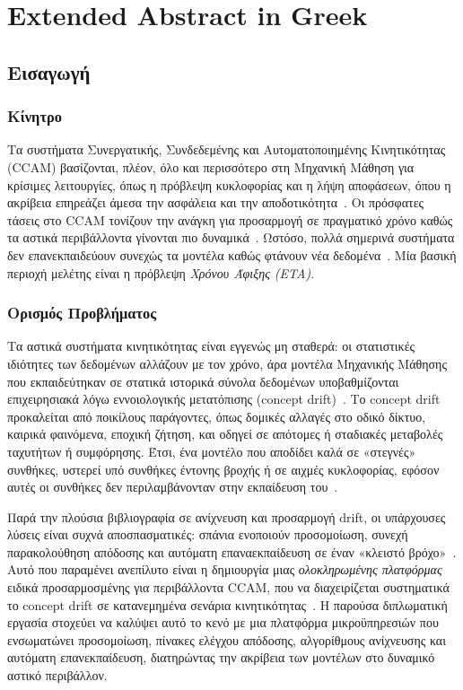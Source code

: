\chapter*{Extended Abstract in Greek}

\section*{Εισαγωγή}

\subsection*{Κίνητρο}
Τα συστήματα Συνεργατικής, Συνδεδεμένης και Αυτοματοποιημένης Κινητικότητας (CCAM) βασίζονται, πλέον, όλο και περισσότερο στη Μηχανική Μάθηση για κρίσιμες λειτουργίες, όπως η πρόβλεψη κυκλοφορίας και η λήψη αποφάσεων, όπου η ακρίβεια επηρεάζει άμεσα την ασφάλεια και την αποδοτικότητα~\cite{ertrac2022ccam}.
Οι πρόσφατες τάσεις στο CCAM τονίζουν την ανάγκη για προσαρμογή σε πραγματικό χρόνο καθώς τα αστικά περιβάλλοντα γίνονται πιο δυναμικά~\cite{abdi2021travel}.
Ωστόσο, πολλά σημερινά συστήματα δεν επανεκπαιδεύουν συνεχώς τα μοντέλα καθώς φτάνουν νέα δεδομένα~\cite{arifi2024eta}.
Μία βασική περιοχή μελέτης είναι η πρόβλεψη \textit{Χρόνου Άφιξης (ETA)}.

\subsection*{Ορισμός Προβλήματος}
Τα αστικά συστήματα κινητικότητας είναι εγγενώς μη σταθερά: οι στατιστικές ιδιότητες των δεδομένων αλλάζουν με τον χρόνο, άρα μοντέλα Μηχανικής Μάθησης που εκπαιδεύτηκαν σε στατικά ιστορικά σύνολα δεδομένων υποβαθμίζονται επιχειρησιακά λόγω εννοιολογικής μετατόπισης (concept drift)~\cite{gama2014survey, lu2018learning}.
Το concept drift προκαλείται από ποικίλους παράγοντες, όπως δομικές αλλαγές στο οδικό δίκτυο, καιρικά φαινόμενα, εποχική ζήτηση, και οδηγεί σε απότομες ή σταδιακές μεταβολές ταχυτήτων ή συμφόρησης.
Έτσι, ένα μοντέλο που αποδίδει καλά σε «στεγνές» συνθήκες, υστερεί υπό συνθήκες έντονης βροχής ή σε αιχμές κυκλοφορίας, εφόσον αυτές οι συνθήκες δεν περιλαμβάνονταν στην εκπαίδευση του~\cite{baier2020error}.

Παρά την πλούσια βιβλιογραφία σε ανίχνευση και προσαρμογή drift, οι υπάρχουσες λύσεις είναι συχνά αποσπασματικές: σπάνια ενοποιούν προσομοίωση, συνεχή παρακολούθηση απόδοσης και αυτόματη επαναεκπαίδευση σε έναν «κλειστό βρόχο»~\cite{lu2018learning, greco2025drift}.
Αυτό που παραμένει ανεπίλυτο είναι η δημιουργία μιας \textit{ολοκληρωμένης πλατφόρμας} ειδικά προσαρμοσμένης για περιβάλλοντα CCAM, που να διαχειρίζεται συστηματικά το concept drift σε κατανεμημένα σενάρια κινητικότητας~\cite{xin2024lit, modesto2025self}.
Η παρούσα διπλωματική εργασία στοχεύει να καλύψει αυτό το κενό με μια πλατφόρμα μικροϋπηρεσιών που ενσωματώνει προσομοίωση, πίνακες ελέγχου απόδοσης, αλγορίθμους ανίχνευσης και αυτόματη επανεκπαίδευση, διατηρώντας την ακρίβεια των μοντέλων στο δυναμικό αστικό περιβάλλον.

